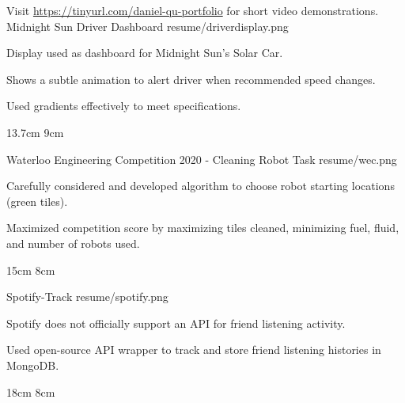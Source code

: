 

\begin{cventries}

  Visit \href{https://docs.google.com/document/d/e/2PACX-1vS0EqgEdK7blzAP3eqhoXZXuYXNIMIreo-fD56--8hDs616NmmvpaythZmCKw7Pt4CDEAfRSdoIxmMB/pub}{https://tinyurl.com/daniel-qu-portfolio} for short video demonstrations.
  \\%
  \portfolioEntry
    {Midnight Sun Driver Dashboard} %
    {resume/driverdisplay.png} %
    {
      \begin{cvitems} %
        \item {Display used as dashboard for Midnight Sun's Solar Car.}
        \item {Shows a subtle animation to alert driver when recommended speed changes.}
        \item {Used gradients effectively to meet specifications.}
      \end{cvitems}
    }
    {13.7cm}
    {9cm}

  \portfolioEntry
    {Waterloo Engineering Competition 2020 - Cleaning Robot Task} %
    {resume/wec.png} %
    {
      \begin{cvitems} %
        \item {Carefully considered and developed algorithm to choose robot starting locations (green tiles).}
        \item {Maximized competition score by maximizing tiles cleaned, minimizing fuel, fluid, and number of robots used.}
      \end{cvitems}
    }
    {15cm}
    {8cm}
  
  \newpage

  \portfolioEntry
    {Spotify-Track} %
    {resume/spotify.png} %
    {
      \begin{cvitems} %
        \item {Spotify does not officially support an API for friend listening activity.}
        \item {Used open-source API wrapper to track and store friend listening histories in MongoDB.}
      \end{cvitems}
    }
    {18cm}
    {8cm}

\end{cventries}
